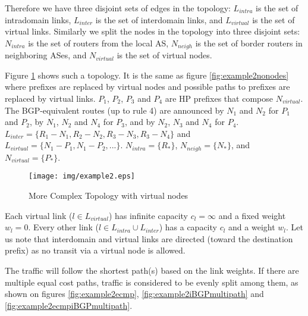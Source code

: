 \documentclass{acm_proc_article-sp}
\begin{document}
Therefore we have three disjoint sets of edges in the topology: $L_{intra}$ is
the set of intradomain links, $L_{inter}$ is the set of
interdomain links, and $L_{virtual}$ is the set of
virtual links. Similarly we split the nodes in the topology into three disjoint sets:
$N_{intra}$ is the set of routers
from the local AS, $N_{neigh}$ is the set of border routers
in neighboring ASes, and
$N_{virtual}$ is the set of virtual nodes.

Figure \ref{fig:example2} shows such a topology. It is the same as
figure \ref{fig:example2nonodes} where prefixes are replaced by
virtual nodes and possible paths to prefixes are replaced by virtual links.
$P_1$, $P_2$, $P_3$ and $P_4$ are HP prefixes that compose $N_{virtual}$. 
The BGP-equivalent routes (up to rule 4) are announced by $N_1$ and $N_2$ for $P_1$ and $P_2$, by $N_1$,
$N_2$ and $N_4$ for $P_3$, and by $N_2$, $N_3$ and $N_4$ for $P_4$.
$L_{inter} = \{R_1-N_1,R_2-N_2,R_3-N_3,R_3-N_4\}$ and $L_{virtual} =
\{N_1-P_1,N_1-P_2,...\}$. $N_{intra} = \{R_*\}$, $N_{neigh} =
\{N_*\}$, and $N_{virtual} = \{P_*\}$.

\begin{figure}[htbp]
  \centering
  \texttt{[image: img/example2.eps]}
  \caption{More Complex Topology with virtual nodes}
  \label{fig:example2}
\end{figure}

Each virtual link ($l \in L_{virtual}$) has infinite
capacity $c_l=\infty$ and a fixed weight $w_l=0$. 
Every other link ($l \in L_{intra} \cup  L_{inter}$) has a capacity $c_l$ and a
weight $w_l$. 
Let us note that interdomain and virtual links are directed (toward
the destination prefix) as no transit via a virtual node is
allowed.

The traffic will follow the shortest path(s) 
based on the link weights. If there are multiple equal cost paths,
traffic is considered to be evenly split among them, as shown on figures
\ref{fig:example2ecmp}, \ref{fig:example2iBGPmultipath} and
\ref{fig:example2ecmpiBGPmultipath}.
\end{document}
